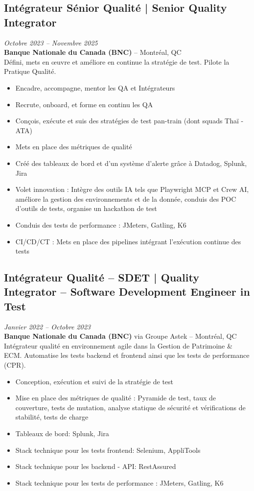 \documentclass[11pt,a4paper]{article}
\begin{document}
\subsection*{Intégrateur Sénior Qualité | Senior Quality Integrator} \hfill \textit{Octobre 2023 -- Novembre 2025}\\
\textbf{Banque Nationale du Canada (BNC)} -- Montréal, QC\\
Défini, mets en œuvre et améliore en continue la stratégie de test. Pilote la Pratique Qualité.
\begin{itemize}
    \item Encadre, accompagne, mentor les QA et Intégrateurs
    \item Recrute, onboard, et forme en continu les QA
    \item Conçois, exécute et suis des stratégies de test pan-train (dont squads Thaï - ATA)
    \item Mets en place des métriques de qualité
    \item Créé des tableaux de bord et d'un système d'alerte grâce à Datadog, Splunk, Jira
    \item Volet innovation : Intègre des outils IA tels que Playwright MCP et Crew AI, améliore la gestion des environnements et de la donnée, conduis des POC d'outils de tests, organise un hackathon de test
    \item Conduis des tests de performance : JMeters, Gatling, K6
    \item CI/CD/CT : Mets en place des pipelines intégrant l'exécution continue des tests
\end{itemize}

\subsection*{Intégrateur Qualité -- SDET | Quality Integrator -- Software Development Engineer in Test} \hfill \textit{Janvier 2022 -- Octobre 2023}\\
\textbf{Banque Nationale du Canada (BNC)} via Groupe Astek -- Montréal, QC\\
Intégrateur qualité en environnement agile dans la Gestion de Patrimoine \& ECM. Automatise les tests backend et frontend ainsi que les tests de performance (CPR).
\begin{itemize}
    \item Conception, exécution et suivi de la stratégie de test
    \item Mise en place des métriques de qualité : Pyramide de test, taux de couverture, tests de mutation, analyse statique de sécurité et vérifications de stabilité, tests de charge
    \item Tableaux de bord: Splunk, Jira
    \item Stack technique pour les tests frontend: Selenium, AppliTools
    \item Stack technique pour les backend - API: RestAssured
    \item Stack technique pour les tests de performance : JMeters, Gatling, K6
\end{itemize}
\end{document}
